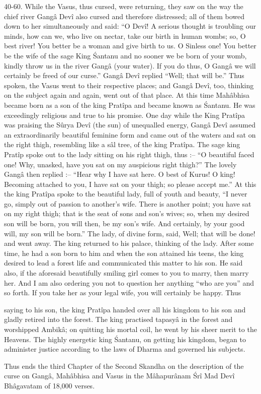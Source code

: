 40-60. While the Vasus, thus cursed, were returning, they saw on the way the chief river Gang\^a Dev\^i also cursed and therefore distressed; all of them bowed down to her simultaneously and said: ``O Dev\^i! A serious thought is troubling our minds, how can we, who live on nectar, take our birth in human wombs; so, O best river! You better be a woman and give birth to us. O Sinless one! You better be the wife of the sage King \'Santanu and no sooner we be born of your womb, kindly throw us in the river Gang\^a (your water). If you do thus, O Gang\^a we will certainly be freed of our curse.'' Gang\^a Dev\^i replied ``Well; that will be.'' Thus spoken, the Vasus went to their respective places; and Gang\^a Dev\^i, too, thinking on the subject again and again, went out of that place. At this time Mah\^abhisa became born as a son of the king Prat\^ipa and became known as \'Santanu. He was exceedingly religious and true to his promise. One day while the King Prat\^ipa was praising the S\^urya Dev\^i (the sun) of unequalled energy, Gang\^a Dev\^i assumed an extraordinarily beautiful feminine form and came out of the waters and sat on the right thigh, resembling like a s\^al tree, of the king Prat\^ipa. The sage king Prat\^ip spoke out to the lady sitting on his right thigh, thus :-- ``O beautiful faced one! Why, unasked, have you sat on my auspicious right thigh?'' The lovely Gang\^a then replied :-- ``Hear why I have sat here. O best of Kurus! O king! Becoming attached to you, I have sat on your thigh; so please accept me.'' At this the king Prat\^ipa spoke to the beautiful lady, full of youth and beauty, ``I never go, simply out of passion to another's wife. There is another point; you have sat on my right thigh; that is the seat of sons and son's wives; so, when my desired son will be born, you will then, be my son's wife. And certainly, by your good will, my son will be born.'' The lady, of divine form, said, Well; that will be done! and went away. The king returned to his palace, thinking of the lady. After some time, he had a son born to him and when the son attained his teens, the king desired to lead a forest life and communicated this matter to his son. He said also, if the aforesaid beautifully smiling girl comes to you to marry, then marry her. And I am also ordering you not to question her anything ``who are you'' and so forth. If you take her as your legal wife, you will certainly be happy. Thus

saying to his son, the king Prat\^ipa handed over all his kingdom to his son and gladly retired into the forest. The king practised tapasy\^a in the forest and worshipped Ambik\^a; on quitting his mortal coil, he went by his sheer merit to the Heavens. The highly energetic king \'Santanu, on getting his kingdom, began to administer justice according to the laws of Dharma and governed his subjects.

Thus ends the third Chapter of the Second Skandha on the description of the curse on Gang\^a, Mah\^abhisa and Vasus in the M\^ahapur\^anam \'Sr\^i Mad Dev\^i Bh\^agavatam of 18,000 verses.